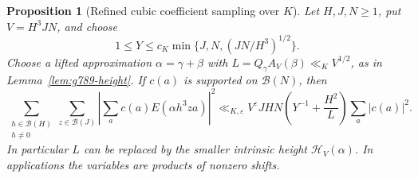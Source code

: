 \documentclass[11pt]{amsart}
\newtheorem{proposition}[theorem]{Proposition}
\theoremstyle{definition}
\numberwithin{equation}{section}
\begin{document}
\begin{proposition}[Refined cubic coefficient sampling over $K$]
\label{prop:g789-sampling}
Let $H,J,N\ge1$, put $V=H^3JN$, and choose
\[
 1\le Y\le c_K\min\{J,N,(JN/H^3)^{1/2}\}.
\]
Choose a lifted approximation $\alpha=\gamma+\beta$ with
$L=Q_\gamma A_V(\beta)\ll_K V^{1/2}$, as in
Lemma~\ref{lem:g789-height}. If $c(a)$ is supported on $\mathcal B(N)$,
then
\[
 \sum_{\substack{h\in\mathcal B(H)\\h\ne0}}
 \sum_{z\in\mathcal B(J)}
       \left|\sum_a c(a)E(\alpha h^3za)\right|^2
 \ll_{K,\varepsilon}
 V^\varepsilon JHN\left(Y^{-1}+\frac{H^2}{L}\right)
                          \sum_a|c(a)|^2.
\]
In particular $L$ can be replaced by the smaller intrinsic height
$\mathcal H_V(\alpha)$. In
applications the variables are products of nonzero shifts.
\end{proposition}
\end{document}
